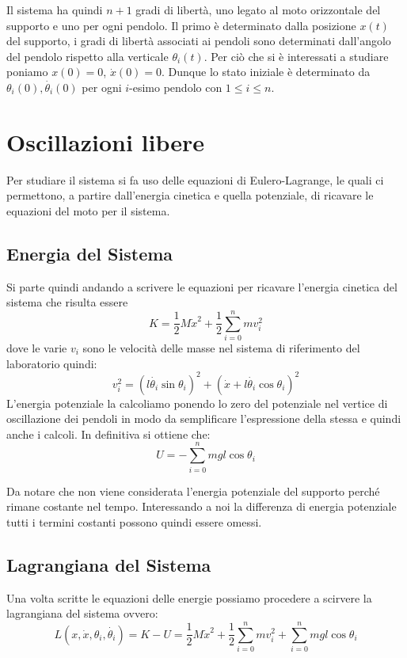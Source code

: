 \documentclass[12pt]{article}
\begin{document}
Il sistema ha quindi $n + 1$ gradi di libertà, uno legato al moto orizzontale del supporto e uno per ogni pendolo. Il primo è determinato dalla posizione $x(t)$ del supporto, i gradi di libertà associati ai pendoli sono determinati dall'angolo del pendolo rispetto alla verticale $\theta_i(t)$. Per ciò che si è interessati a studiare poniamo $x(0) = 0$, $\dot{x}(0) = 0$. Dunque lo stato iniziale è determinato da $\theta_i(0), \dot{\theta_i}(0)$ per ogni $i$-esimo pendolo con $1 \le i \le n$.

\section{Oscillazioni libere}

Per studiare il sistema si fa uso delle equazioni di Eulero-Lagrange, le quali ci permettono, a partire dall'energia cinetica e quella potenziale, di ricavare le equazioni del moto per il sistema.

\subsection{Energia del Sistema}

Si parte quindi andando a scrivere le equazioni per ricavare l'energia cinetica del sistema che risulta essere
\[
K = \frac{1}{2} M \dot{x}^2 + \frac{1}{2} \sum_{i = 0}^n m v_i^2
\]
dove le varie $v_i$ sono le velocità delle masse nel sistema di riferimento del laboratorio quindi:
\[
v_i^2 =\left( l \dot{\theta_i} \sin \theta_i \right) ^ 2 + \left( \dot{x} + l \dot{\theta_i} \cos \theta_i \right) ^ 2
\]
L'energia potenziale la calcoliamo ponendo lo zero del potenziale nel vertice di oscillazione dei pendoli in modo da semplificare l'espressione della stessa e quindi anche i calcoli. In definitiva si ottiene che: 
\[
U = - \sum_{i = 0}^n mgl\cos \theta_i
\]

Da notare che non viene considerata l'energia potenziale del supporto  perché rimane costante nel tempo. Interessando a noi la differenza di energia potenziale tutti i termini costanti possono quindi essere omessi.

\subsection{Lagrangiana del Sistema}

Una volta scritte le equazioni delle energie possiamo procedere a scirvere la lagrangiana del sistema ovvero:
\[
L\left(x, \dot{x}, \theta_i, \dot{\theta_i}\right) = K - U = \frac{1}{2} M \dot{x}^2 + \frac{1}{2} \sum_{i = 0}^n m v_i^2 + \sum_{i = 0}^n mgl\cos \theta_i
\]
\end{document}
